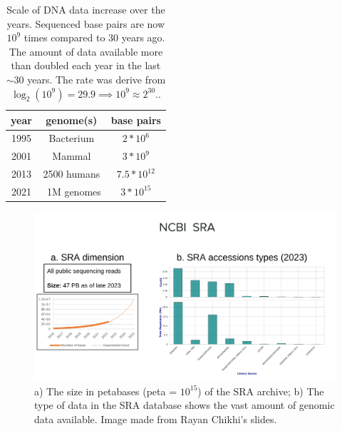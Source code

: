 \begin{table}[!ht]
	\centering
	\begin{tabular}{c | c | c}
		year & genome(s) & base pairs \\
		\hline
		1995 & Bacterium & $ 2*10^6$ \\
		2001 & Mammal & $ 3*10^9$ \\
		2013 & 2500 humans & $ 7.5*10^12$ \\
		2021 & ~1M genomes & $ 3*10^{15}$ \\
	\end{tabular}
	\caption[Scale of DNA data increase over the years.]{Scale of DNA data increase over the years. Sequenced base pairs are now $10^9$ times compared to 30 years ago. The amount of data available more than doubled each year in the last $\sim30$ years. The rate was derive from $ \log_2(10^9) = 29.9 \implies 10^9 \approx 2^{30}$.\cite{durbin_recomb}.}
	\label{tab:bp-increase}
\end{table}
\begin{figure}[h!]
	\centering
	\includegraphics[width=\linewidth]{figures/background/sra.png}
	\caption[The Sequence Read Archive.]{a) The size in petabases (peta = $10^{15}$) of the SRA archive; b) The type of data in the SRA database shows the vast amount of genomic data available. Image made from Rayan Chikhi's slides.\\}
	\label{fig:SRA}
\end{figure}

